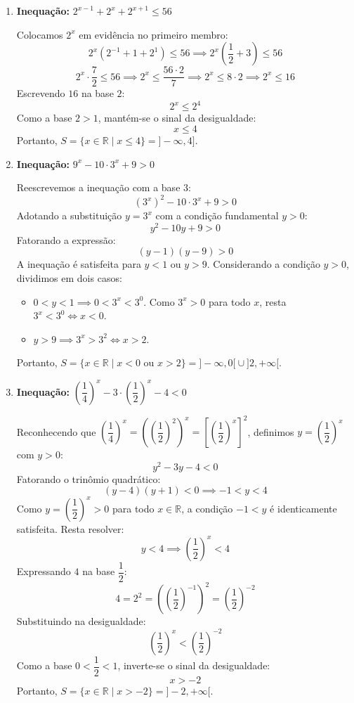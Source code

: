 \documentclass[12pt,a4paper]{report}
\begin{document}
\begin{enumerate}[label=\textbf{\arabic*.}]
		\vspace{0.4cm}
		
		\item \textbf{Inequação:} $2^{x-1} + 2^x + 2^{x+1} \leqslant 56$
		
		Colocamos $2^x$ em evidência no primeiro membro:
		\[
		2^x \left( 2^{-1} + 1 + 2^1 \right) \leqslant 56 \implies 2^x \left( \frac{1}{2} + 3 \right) \leqslant 56
		\]
		\[
		2^x \cdot \frac{7}{2} \leqslant 56 \implies 2^x \leqslant \frac{56 \cdot 2}{7} \implies 2^x \leqslant 8 \cdot 2 \implies 2^x \leqslant 16
		\]
		Escrevendo $16$ na base $2$:
		\[
		2^x \leqslant 2^4
		\]
		Como a base $2 > 1$, mantém-se o sinal da desigualdade:
		\[
		x \leqslant 4
		\]
		Portanto, $S = \{x \in \mathbb{R} \mid x \leqslant 4\} = {]-\infty, 4]}$.
		
		\vspace{0.4cm}
		
		\item \textbf{Inequação:} $9^x - 10 \cdot 3^x + 9 > 0$
		
		Reescrevemos a inequação com a base $3$:
		\[
		(3^x)^2 - 10 \cdot 3^x + 9 > 0
		\]
		Adotando a substituição $y = 3^x$ com a condição fundamental $y > 0$:
		\[
		y^2 - 10y + 9 > 0
		\]
		Fatorando a expressão:
		\[
		(y - 1)(y - 9) > 0
		\]
		A inequação é satisfeita para $y < 1$ ou $y > 9$. Considerando a condição $y > 0$, dividimos em dois casos:
		\begin{itemize}
			\item $0 < y < 1 \implies 0 < 3^x < 3^0$. Como $3^x > 0$ para todo $x$, resta $3^x < 3^0 \iff x < 0$.
			\item $y > 9 \implies 3^x > 3^2 \iff x > 2$.
		\end{itemize}
		Portanto, $S = \{x \in \mathbb{R} \mid x < 0 \text{ ou } x > 2\} = {]-\infty, 0[} \cup {]2, +\infty[}$.
		
		\vspace{0.4cm}
		
		\item \textbf{Inequação:} $\left( \dfrac{1}{4} \right)^x - 3 \cdot \left( \dfrac{1}{2} \right)^x - 4 < 0$
		
		Reconhecendo que $\left(\dfrac{1}{4}\right)^x = \left(\left(\dfrac{1}{2}\right)^2\right)^x = \left[\left(\dfrac{1}{2}\right)^x\right]^2$, definimos $y = \left(\dfrac{1}{2}\right)^x$ com $y > 0$:
		\[
		y^2 - 3y - 4 < 0
		\]
		Fatorando o trinômio quadrático:
		\[
		(y - 4)(y + 1) < 0 \implies -1 < y < 4
		\]
		Como $y = \left(\dfrac{1}{2}\right)^x > 0$ para todo $x \in \mathbb{R}$, a condição $-1 < y$ é identicamente satisfeita. Resta resolver:
		\[
		y < 4 \implies \left(\frac{1}{2}\right)^x < 4
		\]
		Expressando $4$ na base $\dfrac{1}{2}$:
		\[
		4 = 2^2 = \left( \left(\frac{1}{2}\right)^{-1} \right)^2 = \left(\frac{1}{2}\right)^{-2}
		\]
		Substituindo na desigualdade:
		\[
		\left(\frac{1}{2}\right)^x < \left(\frac{1}{2}\right)^{-2}
		\]
		Como a base $0 < \dfrac{1}{2} < 1$, inverte-se o sinal da desigualdade:
		\[
		x > -2
		\]
		Portanto, $S = \{x \in \mathbb{R} \mid x > -2\} = {]-2, +\infty[}$.
		

\end{enumerate}
\end{document}

